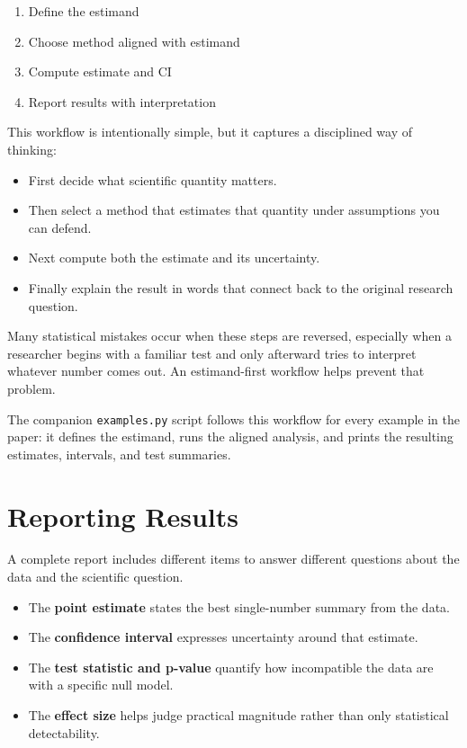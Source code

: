\documentclass[11pt]{article}
\begin{document}
\begin{enumerate}
\item Define the estimand
\item Choose method aligned with estimand
\item Compute estimate and CI
\item Report results with interpretation
\end{enumerate}

This workflow is intentionally simple, but it captures a disciplined way of thinking:
\begin{itemize}
\item First decide what scientific quantity matters.
\item Then select a method that estimates that quantity under assumptions you can defend.
\item Next compute both the estimate and its uncertainty.
\item Finally explain the result in words that connect back to the original research question.
\end{itemize}

Many statistical mistakes occur when these steps are reversed, especially when a researcher begins with a familiar test and only afterward tries to interpret whatever number comes out. An estimand-first workflow helps prevent that problem.

The companion \verb|examples.py| script follows this workflow for every example in the paper: it defines the estimand, runs the aligned analysis, and prints the resulting estimates, intervals, and test summaries.


\section{Reporting Results}

A complete report includes different items to answer different questions about the data and the scientific question. 

\begin{itemize}
\item The \textbf{point estimate} states the best single-number summary from the data.
\item The \textbf{confidence interval} expresses uncertainty around that estimate.
\item The \textbf{test statistic and p-value} quantify how incompatible the data are with a specific null model.
\item The \textbf{effect size} helps judge practical magnitude rather than only statistical detectability.
\end{itemize}
\end{document}
